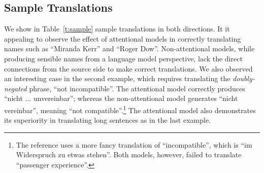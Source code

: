 \subsection{Sample Translations}
\label{sec:sample}
We show in Table~\ref{t:sample} sample translations in both directions. It it
appealing to observe the effect of attentional models in correctly translating
names such as ``Miranda Kerr'' and ``Roger Dow''. Non-attentional models, while producing sensible names from a language
model perspective, lack the direct connections from the source side to make
correct translations. %
We also observed an interesting case in the second
example, which requires translating the {\it doubly-negated} phrase, ``not incompatible''.
The attentional model correctly produces ``nicht $\dots$ unvereinbar'';
whereas the non-attentional model generates ``nicht vereinbar'', meaning
``not compatible''.\footnote{The reference uses a more fancy translation of
``incompatible'', which is ``im Widerspruch zu etwas stehen''. Both models, however, failed to translate ``passenger
experience''.} The attentional
model also demonstrates its superiority in translating long sentences as in
the last example.
